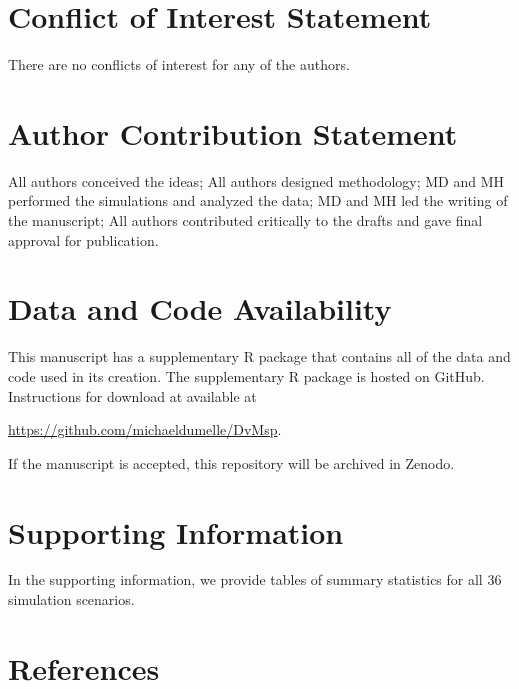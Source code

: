 \documentclass[]{elsarticle} %
\begin{document}
\hypertarget{conflict-of-interest-statement}{%
\section*{Conflict of Interest
Statement}\label{conflict-of-interest-statement}}

There are no conflicts of interest for any of the authors.

\hypertarget{author-contribution-statement}{%
\section*{Author Contribution
Statement}\label{author-contribution-statement}}

All authors conceived the ideas; All authors designed methodology; MD
and MH performed the simulations and analyzed the data; MD and MH led
the writing of the manuscript; All authors contributed critically to the
drafts and gave final approval for publication.

\hypertarget{data-and-code-availability}{%
\section*{Data and Code Availability}\label{data-and-code-availability}}

This manuscript has a supplementary R package that contains all of the
data and code used in its creation. The supplementary R package is
hosted on GitHub. Instructions for download at available at

\url{https://github.com/michaeldumelle/DvMsp}.

If the manuscript is accepted, this repository will be archived in
Zenodo.

\hypertarget{supporting-information}{%
\section*{Supporting Information}\label{supporting-information}}

In the supporting information, we provide tables of summary statistics
for all 36 simulation scenarios.

\hypertarget{references}{%
\section*{References}\label{references}}
\end{document}
